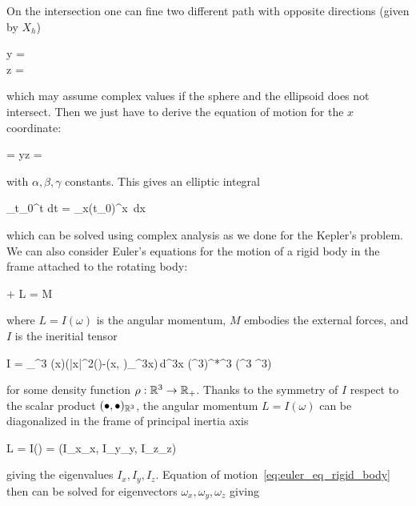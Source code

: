 \documentclass[main.tex]{subfiles}
\begin{document}
\begin{example}
\begin{figure}[H]
		\label{fig:rigid_body_phase_space}
	\end{figure}
	On the intersection one can fine two different path with opposite directions (given by $X_h$)
	\begin{eqalign}
		\begin{cases}
			y = \pm {}\\
			z = \pm {}
		\end{cases}
	\end{eqalign}
	which may assume complex values if the sphere and the ellipsoid does not intersect. Then we just have to derive the equation of motion for the $x$ coordinate:
	\begin{eqalign}
		 = yz = \sqrt{\alpha+\beta x^2 + \gamma x^4}
	\end{eqalign}
	with $\alpha, \beta, \gamma$ constants. This gives an elliptic integral
	\begin{eqalign}
		\int_{t_0}^t dt = \int_{x(t_0)}^x \frac{1}{}\,dx
	\end{eqalign}
	which can be solved using complex analysis as we done for the Kepler's problem.\\
	We can also consider Euler's equations for the motion of a rigid body in the frame attached to the rotating body:
	\begin{eqalign}
	\label{eq:euler_eq_rigid_body}
		 + \omega\times L = M
	\end{eqalign}
	where $L=I(\omega)$ is  the angular momentum, $M$ embodies the external forces, and $I$ is the ineritial tensor
	\begin{eqalign}
		I = \int_{\R^3} \rho(\vec x)\big(|\vec x|^2\id(\bullet)-(\vec x, \bullet)_{\R^3}\tens \vec x\big)\,d^3x \in (\R^3)^*\tens \R^3 \simeq \Hom(\R^3 \to \R^3)
	\end{eqalign}
	for some density function $\rho : \mathbb{R}^3\to\mathbb{R}_+$. Thanks to the symmetry of $I$ respect to the scalar product $(\bullet, \bullet)_{\mathbb{R}^3}$, the angular momentum $L=I(\omega)$ can be diagonalized in the frame of principal inertia axis
	\begin{eqalign}
		L = I(\omega) = (I_x\omega_x, I_y\omega_y, I_z\omega_z)
	\end{eqalign}
	giving the eigenvalues $I_x, I_y, I_z$. Equation of motion~\eqref{eq:euler_eq_rigid_body} then can be solved for eigenvectors $\omega_x, \omega_y, \omega_z$ giving

\end{example}
\end{document}
